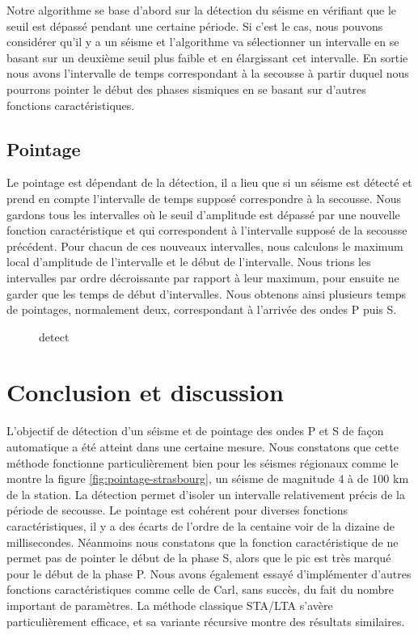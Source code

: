 \documentclass[a4paper, 11pt]{article} %
\begin{document}
Notre algorithme se base d'abord sur la détection du séisme en vérifiant que le seuil est dépassé pendant une certaine période. Si c'est le cas, nous pouvons considérer qu'il y a un séisme et l'algorithme va sélectionner un intervalle en se basant sur un deuxième seuil plus faible et en élargissant cet intervalle. En sortie nous avons l'intervalle de temps correspondant à la secousse à partir duquel nous pourrons pointer le début des phases sismiques en se basant sur d'autres fonctions caractéristiques.

\subsection{Pointage}

Le pointage est dépendant de la détection, il a lieu que si un séisme est détecté et prend en compte l'intervalle de temps supposé correspondre à la secousse. Nous gardons tous les intervalles où le seuil d'amplitude est dépassé par une nouvelle fonction caractéristique et qui correspondent à l'intervalle supposé de la secousse précédent. Pour chacun de ces nouveaux intervalles, nous calculons le maximum local d'amplitude de l'intervalle et le début de l'intervalle. Nous trions les intervalles par ordre décroissante par rapport à leur maximum, pour ensuite ne garder que les temps de début d'intervalles. Nous obtenons ainsi plusieurs temps de pointages, normalement deux, correspondant à l'arrivée des ondes P puis S.

\begin{figure}[!ht]
    \centering
    \scalebox{.9}{}
    \caption{detect}
    \label{fig:pointage-turquie}
\end{figure}

\section{Conclusion et discussion}

L'objectif de détection d'un séisme et de pointage des ondes P et S de façon automatique a été atteint dans une certaine mesure. Nous constatons que cette méthode fonctionne particulièrement bien pour les séismes régionaux comme le montre la figure \ref{fig:pointage-strasbourg}, un séisme de magnitude 4 à de 100 km de la station. La détection permet d'isoler un intervalle relativement précis de la période de secousse. Le pointage est cohérent pour diverses fonctions caractéristiques, il y a des écarts de l'ordre de la centaine voir de la dizaine de millisecondes. Néanmoins nous constatons que la fonction caractéristique de \cite{baer1987} ne permet pas de pointer le début de la phase S, alors que le pic est très marqué pour le début de la phase P. Nous avons également essayé d'implémenter d'autres fonctions caractéristiques comme celle de Carl, sans succès, du fait du nombre important de paramètres. La méthode classique STA/LTA s'avère particulièrement efficace, et sa variante récursive montre des résultats similaires.
\end{document}
